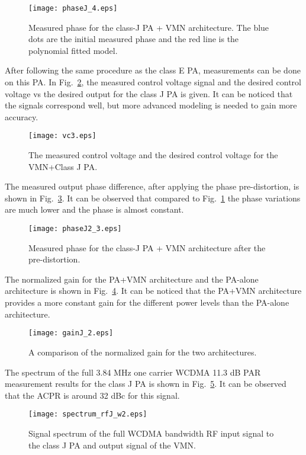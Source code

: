 \documentclass[10pt,journal]{IEEEtran}
\begin{document}
\begin{figure}
\centering
\texttt{[image: phaseJ\_4.eps]}
\caption{Measured phase for the class-J PA + VMN architecture. The blue dots are the initial measured phase and the red line is the polynomial fitted model.}
\label{phaseJ}
\end{figure}

After following the same procedure as the class E PA, measurements can be done on this PA. In Fig.~\ref{vc}, the measured control voltage signal and the desired control voltage vs the desired output for the class J PA is given. It can be noticed that the signals correspond well, but more advanced modeling is needed to gain more accuracy.

\begin{figure}
\centering
\texttt{[image: vc3.eps]}
\caption{The measured control voltage  and the desired control voltage for the VMN+Class J PA.}
\label{vc}
\end{figure}

The measured output phase difference, after applying the phase pre-distortion, is shown in Fig.~\ref{phaseJ1}. It can be observed that compared to Fig.~\ref{phaseJ} the phase variations are much lower and the phase is almost constant.

\begin{figure}
\centering
\texttt{[image: phaseJ2\_3.eps]}
\caption{Measured phase for the class-J PA + VMN architecture after the pre-distortion.}
\label{phaseJ1}
\end{figure}

The normalized gain for the PA+VMN architecture and the PA-alone architecture is shown in Fig.~\ref{gainJ}. It can be noticed that the PA+VMN architecture provides a more constant gain for the different power levels than the PA-alone architecture.

\begin{figure}
\centering
\texttt{[image: gainJ\_2.eps]}
\caption{A comparison of the normalized gain for the two architectures.}
\label{gainJ}
\end{figure}

The spectrum of the full 3.84 MHz one carrier WCDMA 11.3 dB PAR measurement results for the class J PA is shown in Fig.~\ref{spct_rfJ_w}. It can be observed that the ACPR is around 32 dBc for this signal.

\begin{figure}
\centering
\texttt{[image: spectrum\_rfJ\_w2.eps]}
\caption{Signal spectrum of the full WCDMA bandwidth RF input signal to the class J PA and output signal of the VMN.} \label{spct_rfJ_w}
\end{figure}
\end{document}
